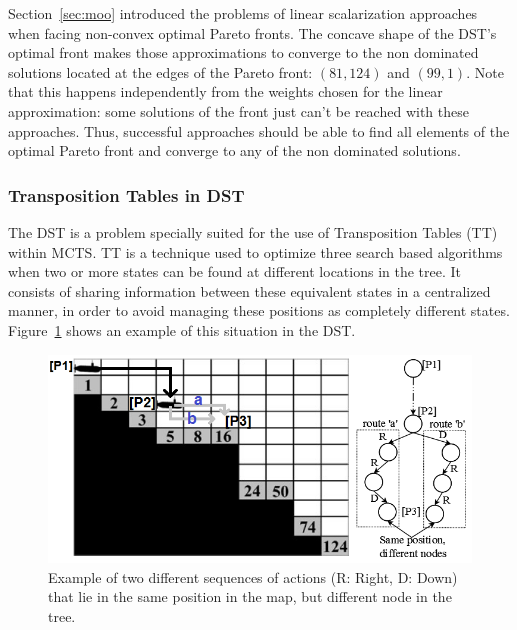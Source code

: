 \documentclass[journal]{IEEEtran}
\begin{document}
Section~\ref{sec:moo} introduced the problems of linear scalarization approaches when facing non-convex optimal Pareto fronts. The concave shape of the DST's optimal front makes those approximations to converge to the non dominated solutions located at the edges of the Pareto front: $(81,124)$ and $(99,1)$. Note that this happens independently from the weights chosen for the linear approximation: some solutions of the front just can't be reached with these approaches. Thus, successful approaches should be able to find all elements of the optimal Pareto front and converge to any of the non dominated solutions.

\subsubsection{Transposition Tables in DST} \label{ssec:transTables}

The DST is a problem specially suited for the use of Transposition Tables (TT)~\cite{Childs2008} within MCTS. TT is a technique used to optimize three search based algorithms when two or more states can be found at different locations in the tree. It consists of sharing information between these equivalent states in a centralized manner, in order to avoid managing these positions as completely different states. Figure~\ref{fig:dstTable} shows an example of this situation in the DST.

\begin{figure}[!t]
\begin{center}
\includegraphics[width=0.9\columnwidth]{img/dstTransTables}
\end{center}
\caption{Example of two different sequences of actions (R: Right, D: Down) that lie in the same position in the map, but different node in the tree.}
\label{fig:dstTable}
\end{figure}
\end{document}
